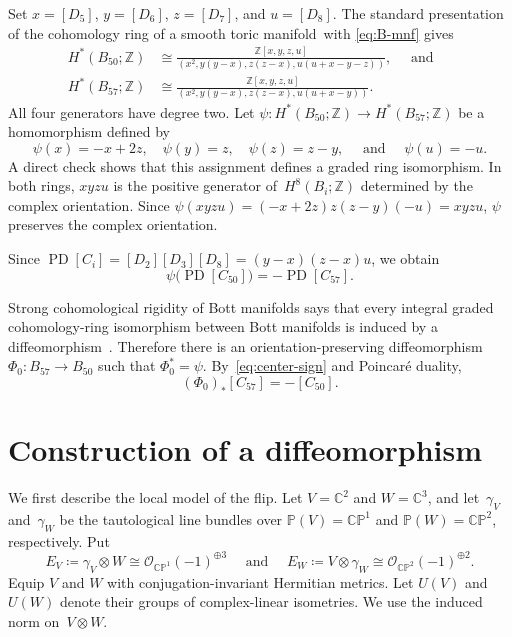 \documentclass{amsart}
\numberwithin{equation}{section}
\theoremstyle{definition}
\newcommand{\Z}{\mathbb Z}
\newcommand{\C}{\mathbb C}
\renewcommand{\P}{\mathbb P}
\newcommand{\cO}{\mathcal O}
\newcommand{\CP}{\mathbb{CP}}
\newcommand{\wideand}{ \quad \text{ and } \quad }
\DeclareMathOperator{\PD}{PD}
\begin{document}
Set $x=[D_5]$, $y=[D_6]$, $z=[D_7]$, and $u=[D_8]$.
The standard presentation of the cohomology ring of a smooth toric manifold~with \eqref{eq:B-mnf} gives
\begin{align*}
    H^\ast(B_{50};\Z) &\cong \frac{\Z[x,y,z,u]}{(x^2, y(y-x), z(z-x), u(u+x-y-z))}, \wideand\\
    H^\ast(B_{57};\Z) &\cong \frac{\Z[x,y,z,u]}{(x^2, y(y-x), z(z-x), u(u+x-y))}.
\end{align*}
All four generators have degree two.
Let $\psi\colon H^\ast(B_{50};\Z)\to H^\ast(B_{57};\Z)$ be a homomorphism defined by 
$$
    \psi(x)=-x+2z, \quad \psi(y)=z, \quad \psi(z)=z-y, \wideand \psi(u)=-u.
$$
A direct check shows that this assignment defines a graded ring isomorphism.
In both rings, $xyzu$ is the positive generator of~$H^8(B_i;\Z)$ determined by the complex orientation. 
Since $\psi(xyzu)=(-x+2z)z(z-y)(-u)=xyzu$, $\psi$ preserves the complex orientation.

Since $\PD[C_i]=[D_2][D_3][D_8]=(y-x)(z-x)u$, we obtain
\begin{equation}\label{eq:center-sign}
    \psi\bigl(\PD[C_{50}]\bigr) =-\PD[C_{57}].
\end{equation}

Strong cohomological rigidity of Bott manifolds says that every integral graded cohomology-ring isomorphism between Bott manifolds is induced by a diffeomorphism~\cite[Theorem~1.1]{Choi-Hwang-Jang2025}. 
Therefore there is an orientation-preserving diffeomorphism~$\Phi_0\colon B_{57}\to B_{50}$ such that $\Phi_0^*=\psi$.
By~\eqref{eq:center-sign} and Poincar\'e duality, 
\begin{equation}\label{eq:homology-sign} 
    (\Phi_0)_*[C_{57}]=-[C_{50}]. 
\end{equation}


\section{Construction of a diffeomorphism} \label{sec:transport}

We first describe the local model of the flip. 
Let $V=\C^2$ and $W=\C^3$, and let~$\gamma_V$ and~$\gamma_W$ be the tautological line bundles over $\P(V)=\CP^1$ and $\P(W)=\CP^2$, respectively. 
Put
$$
    E_V\coloneq \gamma_V\otimes W \cong \cO_{\CP^1}(-1)^{\oplus3}  \wideand E_W \coloneq V\otimes\gamma_W \cong \cO_{\CP^2}(-1)^{\oplus 2}.
$$
Equip $V$ and $W$ with conjugation-invariant Hermitian metrics.
Let $U(V)$ and~$U(W)$ denote their groups of complex-linear isometries.
We use the induced norm on~$V\otimes W$.
\end{document}
